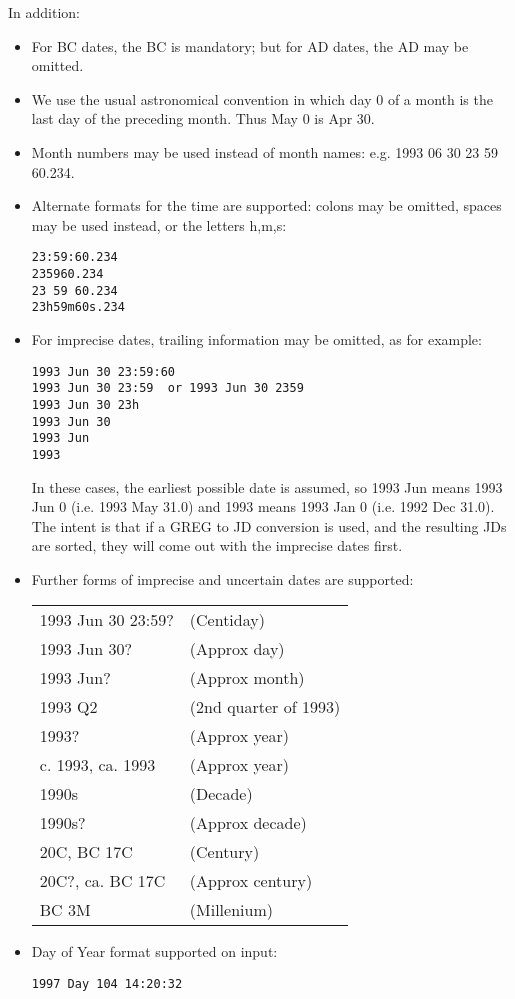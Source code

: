 \documentclass{article}
\begin{document}
In addition:
\begin{itemize}
\item For BC dates, the BC is mandatory; but for AD dates,
the AD may be omitted.

\item We use the usual astronomical convention in which
day 0 of a month is the last day of the preceding month.
Thus May 0 is Apr 30.

\item Month numbers may be used instead of month names:
e.g. 1993 06 30 23 59 60.234.

\item Alternate formats for the time are supported:
colons may be omitted, spaces may be used instead, or the
letters h,m,s:
\begin{verbatim}
23:59:60.234
235960.234
23 59 60.234
23h59m60s.234
\end{verbatim}


\item For imprecise dates, trailing information may be omitted, as for example:
\begin{verbatim}
1993 Jun 30 23:59:60
1993 Jun 30 23:59  or 1993 Jun 30 2359
1993 Jun 30 23h
1993 Jun 30 
1993 Jun
1993
\end{verbatim}
In these cases, the earliest possible date is assumed, so
1993 Jun means 1993 Jun 0 (i.e. 1993 May 31.0) and 1993 means
1993 Jan 0 (i.e. 1992 Dec 31.0). The intent is that
if a GREG to JD conversion is used, and the resulting JDs are
sorted, they will come out with the imprecise dates first.

\item Further forms of imprecise and uncertain dates are
supported:
\begin{longtable}{ll}
1993 Jun 30 23:59?   & (Centiday)\\
1993 Jun 30?         & (Approx day)\\
1993 Jun?            & (Approx month)\\
1993 Q2              & (2nd quarter of 1993)\\
1993?                & (Approx year)\\
c. 1993, ca. 1993    & (Approx year)\\
1990s                & (Decade)\\
1990s?               & (Approx decade)\\
20C, BC 17C          & (Century)\\
20C?, ca. BC 17C     & (Approx century)\\
BC 3M                & (Millenium)\\
\end{longtable}

\item Day of Year format supported on input:
\begin{verbatim}
1997 Day 104 14:20:32
\end{verbatim}


\end{itemize}
\end{document}
